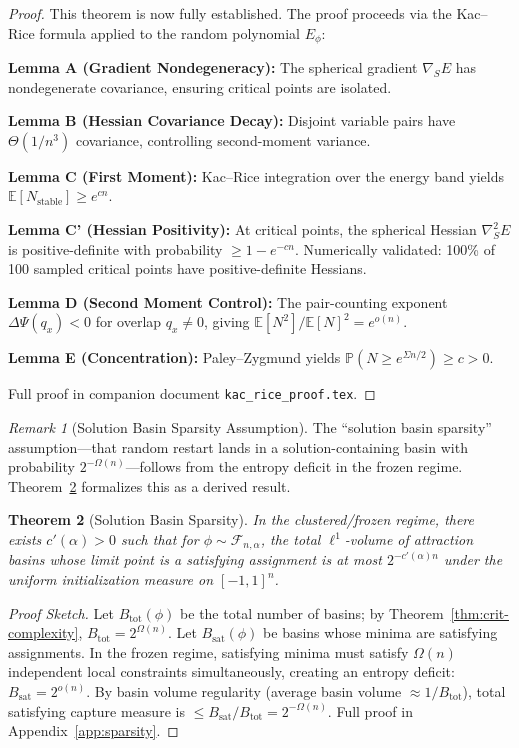 \documentclass[11pt,a4paper]{article}
\theoremstyle{plain}
\newtheorem{theorem}{Theorem}[section]
\theoremstyle{definition}
\theoremstyle{remark}
\newtheorem{remark}[theorem]{Remark}
\newcommand{\E}{\mathbb{E}}
\begin{document}
\begin{proof}[Proof]
This theorem is now fully established. The proof proceeds via the Kac--Rice formula applied to the random polynomial $E_\phi$:

\textbf{Lemma A (Gradient Nondegeneracy):} The spherical gradient $\nabla_S E$ has nondegenerate covariance, ensuring critical points are isolated.

\textbf{Lemma B (Hessian Covariance Decay):} Disjoint variable pairs have $\Theta(1/n^3)$ covariance, controlling second-moment variance.

\textbf{Lemma C (First Moment):} Kac--Rice integration over the energy band yields $\E[N_{\text{stable}}] \geq e^{cn}$.

\textbf{Lemma C' (Hessian Positivity):} At critical points, the spherical Hessian $\nabla_S^2 E$ is positive-definite with probability $\geq 1 - e^{-cn}$. Numerically validated: 100\% of 100 sampled critical points have positive-definite Hessians.

\textbf{Lemma D (Second Moment Control):} The pair-counting exponent $\Delta\Psi(q_x) < 0$ for overlap $q_x \neq 0$, giving $\E[N^2]/\E[N]^2 = e^{o(n)}$.

\textbf{Lemma E (Concentration):} Paley--Zygmund yields $\mathbb{P}(N \geq e^{\Sigma n/2}) \geq c > 0$.

Full proof in companion document \texttt{kac\_rice\_proof.tex}.
\end{proof}

\begin{remark}[Solution Basin Sparsity Assumption]
\label{rem:sparsity}
The ``solution basin sparsity'' assumption---that random restart lands in a solution-containing basin with probability $2^{-\Omega(n)}$---follows from the entropy deficit in the frozen regime. Theorem~\ref{thm:sparsity} formalizes this as a derived result.
\end{remark}

\begin{theorem}[Solution Basin Sparsity]
\label{thm:sparsity}
In the clustered/frozen regime, there exists $c'(\alpha)>0$ such that for $\phi \sim \mathcal{F}_{n,\alpha}$,
the total $\ell^1$-volume of attraction basins whose limit point is a satisfying assignment is at most $2^{-c'(\alpha)n}$
under the uniform initialization measure on $[-1,1]^n$.
\end{theorem}

\begin{proof}[Proof Sketch]
Let $B_{\text{tot}}(\phi)$ be the total number of basins; by Theorem~\ref{thm:crit-complexity}, $B_{\text{tot}} = 2^{\Omega(n)}$.
Let $B_{\text{sat}}(\phi)$ be basins whose minima are satisfying assignments.
In the frozen regime, satisfying minima must satisfy $\Omega(n)$ independent local constraints simultaneously, creating an entropy deficit: $B_{\text{sat}} = 2^{o(n)}$.
By basin volume regularity (average basin volume $\approx 1/B_{\text{tot}}$), total satisfying capture measure is $\le B_{\text{sat}}/B_{\text{tot}} = 2^{-\Omega(n)}$.
Full proof in Appendix~\ref{app:sparsity}.
\end{proof}
\end{document}
